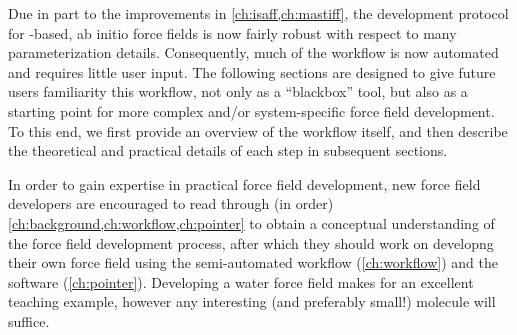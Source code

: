 Due in part to the improvements in \cref{ch:isaff,ch:mastiff}, the development
protocol for \sapt-based, ab initio force fields is now fairly robust with
respect to many parameterization details. Consequently, much of the workflow
is now automated and requires little user input. The following sections are
designed to give future users familiarity this workflow, not only as a
``blackbox'' tool, but also as a starting point for more complex and/or
system-specific force field development. To this end, we first provide an
overview of the workflow itself, and then describe the theoretical and
practical details of each step in subsequent sections.

In order to gain expertise in practical force field development, new force field developers are encouraged to read through (in order)
\cref{ch:background,ch:workflow,ch:pointer} to obtain a conceptual
understanding of the force field development process, after which they should
work on
developng their own force field using
the semi-automated workflow (\cref{ch:workflow}) and the \pointer software
(\cref{ch:pointer}). Developing a water force field
makes for an excellent teaching example, however any interesting (and preferably
small!) molecule will suffice.

